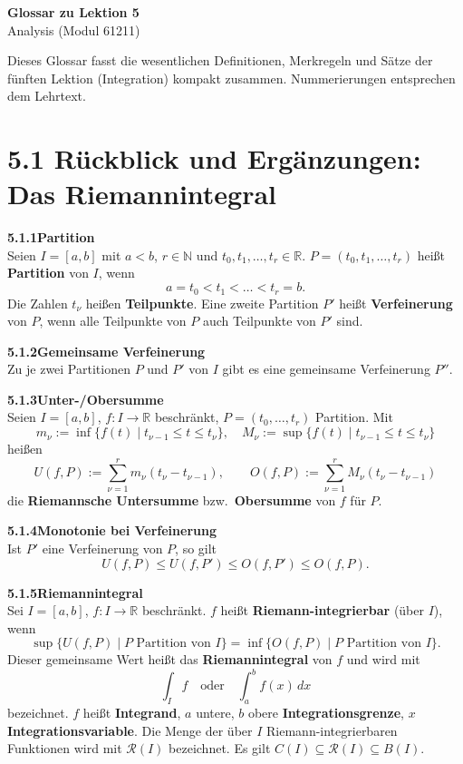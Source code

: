 \documentclass[a4paper,12pt]{article}
\newcommand{\gentry}[3]{%
  \noindent\textbf{#1\quad #2}\nopagebreak\\[0.2em]
  #3\par\smallskip
}
\begin{document}
\begin{center}
  {\LARGE\bfseries Glossar zu Lektion 5}\\[0.5em]
  {\large Analysis (Modul 61211)}
\end{center}

\vspace{1em}

Dieses Glossar fasst die wesentlichen Definitionen, Merkregeln und Sätze der
fünften Lektion (Integration) kompakt zusammen. Nummerierungen entsprechen
dem Lehrtext.

\section*{5.1 \quad Rückblick und Ergänzungen: Das Riemannintegral}

\gentry{5.1.1}{Partition}{%
  Seien $I = [a,b]$ mit $a<b$, $r \in \mathbb{N}$ und $t_0, t_1, \ldots, t_r \in \mathbb{R}$.
  $P = (t_0, t_1, \ldots, t_r)$ heißt \textbf{Partition} von $I$, wenn
  \[
    a = t_0 < t_1 < \ldots < t_r = b.
  \]
  Die Zahlen $t_\nu$ heißen \textbf{Teilpunkte}. Eine zweite Partition $P'$ heißt
  \textbf{Verfeinerung} von $P$, wenn alle Teilpunkte von $P$ auch Teilpunkte
  von $P'$ sind.
}

\gentry{5.1.2}{Gemeinsame Verfeinerung}{%
  Zu je zwei Partitionen $P$ und $P'$ von $I$ gibt es eine gemeinsame
  Verfeinerung $P''$.
}

\gentry{5.1.3}{Unter-/Obersumme}{%
  Seien $I=[a,b]$, $f: I \to \mathbb{R}$ beschränkt, $P = (t_0,\ldots,t_r)$ Partition.
  Mit
  \[
    m_\nu := \inf\{f(t)\mid t_{\nu-1} \leq t \leq t_\nu\}, \quad
    M_\nu := \sup\{f(t)\mid t_{\nu-1} \leq t \leq t_\nu\}
  \]
  heißen
  \[
    U(f,P) := \sum_{\nu=1}^{r} m_\nu (t_\nu - t_{\nu-1}), \qquad
    O(f,P) := \sum_{\nu=1}^{r} M_\nu (t_\nu - t_{\nu-1})
  \]
  die \textbf{Riemannsche Untersumme} bzw.\ \textbf{Obersumme} von $f$ für $P$.
}

\gentry{5.1.4}{Monotonie bei Verfeinerung}{%
  Ist $P'$ eine Verfeinerung von $P$, so gilt
  \[
    U(f,P) \leq U(f,P') \leq O(f,P') \leq O(f,P).
  \]
}

\gentry{5.1.5}{Riemannintegral}{%
  Sei $I=[a,b]$, $f: I \to \mathbb{R}$ beschränkt. $f$ heißt
  \textbf{Riemann-integrierbar} (über $I$), wenn
  \[
    \sup\{U(f,P)\mid P \text{ Partition von } I\}
    = \inf\{O(f,P)\mid P \text{ Partition von } I\}.
  \]
  Dieser gemeinsame Wert heißt das \textbf{Riemannintegral} von $f$ und wird mit
  \[
    \int_I f \quad\text{oder}\quad \int_a^b f(x)\,dx
  \]
  bezeichnet. $f$ heißt \textbf{Integrand}, $a$ untere, $b$ obere
  \textbf{Integrationsgrenze}, $x$ \textbf{Integrationsvariable}. Die Menge der
  über $I$ Riemann-integrierbaren Funktionen wird mit $\mathcal{R}(I)$ bezeichnet.
  Es gilt $C(I) \subseteq \mathcal{R}(I) \subseteq B(I)$.
}
\end{document}
